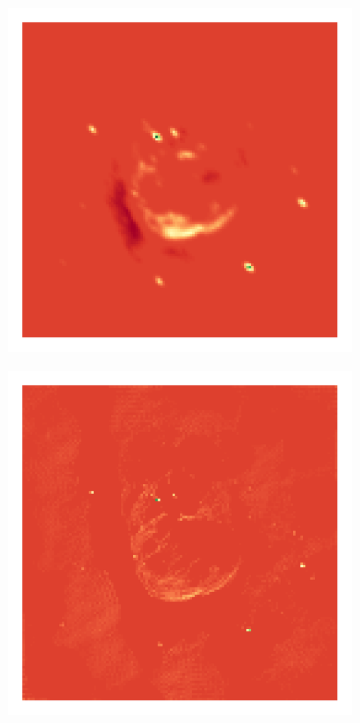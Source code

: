 \begin{figure}[h]
\begin{subfigure}[b]{0.24\linewidth}
		\includegraphics[width=\linewidth, trim={18px 19px 18px 18px}, clip]{./chapters/05.results/g55/clean_model.png}
	\end{subfigure}
	\begin{subfigure}[b]{0.24\linewidth}
		\includegraphics[width=\linewidth, trim={18px 19px 18px 18px}, clip]{./chapters/05.results/g55/positive_deconv_model.png}

\end{subfigure}
\end{figure}
